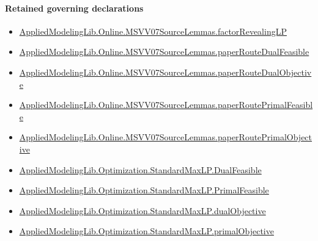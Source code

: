 \documentclass[10pt]{article}
\begin{document}
\paragraph{Retained governing declarations}
\begin{itemize}\raggedright
\item \hyperlink{governing-declaration-1383d899c70ea694}{Applied\allowbreak{}Modeling\allowbreak{}Lib.\allowbreak{}Online.\allowbreak{}MSVV07\allowbreak{}Source\allowbreak{}Lemmas.\allowbreak{}factor\allowbreak{}Revealing\allowbreak{}LP}
\item \hyperlink{governing-declaration-449e6714464a757c}{Applied\allowbreak{}Modeling\allowbreak{}Lib.\allowbreak{}Online.\allowbreak{}MSVV07\allowbreak{}Source\allowbreak{}Lemmas.\allowbreak{}paper\allowbreak{}Route\allowbreak{}Dual\allowbreak{}Feasible}
\item \hyperlink{governing-declaration-a5ed3ad0cc4ee0a8}{Applied\allowbreak{}Modeling\allowbreak{}Lib.\allowbreak{}Online.\allowbreak{}MSVV07\allowbreak{}Source\allowbreak{}Lemmas.\allowbreak{}paper\allowbreak{}Route\allowbreak{}Dual\allowbreak{}Objective}
\item \hyperlink{governing-declaration-2755444917a7e4b6}{Applied\allowbreak{}Modeling\allowbreak{}Lib.\allowbreak{}Online.\allowbreak{}MSVV07\allowbreak{}Source\allowbreak{}Lemmas.\allowbreak{}paper\allowbreak{}Route\allowbreak{}Primal\allowbreak{}Feasible}
\item \hyperlink{governing-declaration-42523a08bb907f06}{Applied\allowbreak{}Modeling\allowbreak{}Lib.\allowbreak{}Online.\allowbreak{}MSVV07\allowbreak{}Source\allowbreak{}Lemmas.\allowbreak{}paper\allowbreak{}Route\allowbreak{}Primal\allowbreak{}Objective}
\item \hyperlink{governing-declaration-abdb5787a7626971}{Applied\allowbreak{}Modeling\allowbreak{}Lib.\allowbreak{}Optimization.\allowbreak{}Standard\allowbreak{}Max\allowbreak{}LP.\allowbreak{}Dual\allowbreak{}Feasible}
\item \hyperlink{governing-declaration-5b414291fe79b441}{Applied\allowbreak{}Modeling\allowbreak{}Lib.\allowbreak{}Optimization.\allowbreak{}Standard\allowbreak{}Max\allowbreak{}LP.\allowbreak{}Primal\allowbreak{}Feasible}
\item \hyperlink{governing-declaration-b12b4262e1edffd6}{Applied\allowbreak{}Modeling\allowbreak{}Lib.\allowbreak{}Optimization.\allowbreak{}Standard\allowbreak{}Max\allowbreak{}LP.\allowbreak{}dual\allowbreak{}Objective}
\item \hyperlink{governing-declaration-a49e3df0a3ee44d1}{Applied\allowbreak{}Modeling\allowbreak{}Lib.\allowbreak{}Optimization.\allowbreak{}Standard\allowbreak{}Max\allowbreak{}LP.\allowbreak{}primal\allowbreak{}Objective}
\end{itemize}
\end{document}
